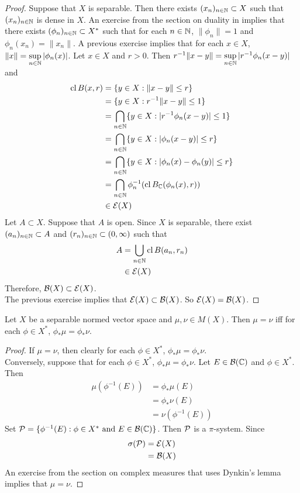 \documentclass{book}
\begin{document}
\begin{proof}
	Suppose that $X$ is separable. Then there exists $(x_n)_{n \in \mathbb{N}} \subset X$ such that $(x_n)_{n \in \mathbb{N}}$ is dense in $X$. An exercise from the section on duality in \cite{analysis} implies that there exists $(\phi_n)_{n \in \mathbb{N}} \subset X^*$ such that for each $n \in \mathbb{N}$, $\|\phi_n\| = 1$ and $\phi_n(x_n) = \|x_n\|$. A previous exercise implies that for each $x \in X$, $\|x\| = \sup\limits_{n \in \mathbb{N}} |\phi_n(x)|$. Let $x \in X$ and $r > 0$. Then $r^{-1}\|x - y \| = \sup\limits_{n \in \mathbb{N}} |r^{-1}\phi_n(x - y)|$ and 
	\begin{align*}
		\operatorname{cl} B(x,r)
		& = \{y \in X: \|x -y \| \leq r\} \\
		& = \{y \in X: r^{-1}\|x - y \| \leq 1\} \\
		& = \bigcap_{n \in \mathbb{N}} \{y \in X: |r^{-1}\phi_n(x - y)| \leq 1\} \\
		& = \bigcap_{n \in \mathbb{N}} \{y \in X: |\phi_n(x - y)| \leq r\} \\ 
		& = \bigcap_{n \in \mathbb{N}} \{y \in X: |\phi_n(x) - \phi_n(y)| \leq r\} \\
		& = \bigcap_{n \in \mathbb{N}} \phi_n^{-1}(\operatorname{cl} B_{\mathbb{C}}(\phi_n (x), r)) \\
		& \in \mathcal{E}(X)
	\end{align*}
	Let $A \subset X$. Suppose that $A$ is open. Since $X$ is separable, there exist $(a_n)_{n \in \mathbb{N}} \subset A$ and $(r_n)_{n \in \mathbb{N}} \subset (0, \infty)$ such that 
	\begin{align*}
		A 
		& = \bigcup_{n \in \mathbb{N}} \operatorname{cl} B(a_n, r_n) \\
		& \in \mathcal{E}(X)
	\end{align*}
	Therefore, $\mathcal{B}(X) \subset \mathcal{E}(X)$. \\
	The previous exercise implies that $\mathcal{E}(X) \subset \mathcal{B}(X)$. So $\mathcal{E}(X) = \mathcal{B}(X)$.
\end{proof}

\begin{ex}
	Let $X$ be a separable normed vector space and $\mu, \nu \in M(X)$. Then $\mu = \nu$ iff for each $\phi \in X^*$, $\phi_*\mu = \phi_*\nu$.
\end{ex}

\begin{proof}
	If $\mu = \nu$, then clearly for each $\phi \in X^*$, $\phi_*\mu = \phi_*\nu$. \\
	Conversely, suppose that for each $\phi \in X^*$, $\phi_*\mu = \phi_*\nu$. Let $E \in \mathcal{B}(\mathbb{C})$ and $\phi \in X^*$. Then 
	\begin{align*}
		\mu(\phi^{-1}(E)) 
		& = \phi_*\mu(E) \\
		& = \phi_*\nu(E) \\
		&= \nu(\phi^{-1}(E))
	\end{align*}
	Set $\mathcal{P} = \{\phi^{-1}(E): \phi \in X^* \text{ and } E \in \mathcal{B}(\mathbb{C})\}$. Then $\mathcal{P}$ is a $\pi$-system. Since 
	\begin{align*}
		\sigma(\mathcal{P}) 
		& = \mathcal{E}(X) \\
		& = \mathcal{B}(X)
	\end{align*}
	An exercise from the section on complex measures that uses Dynkin's lemma implies that $\mu = \nu$.
\end{proof}
\end{document}
